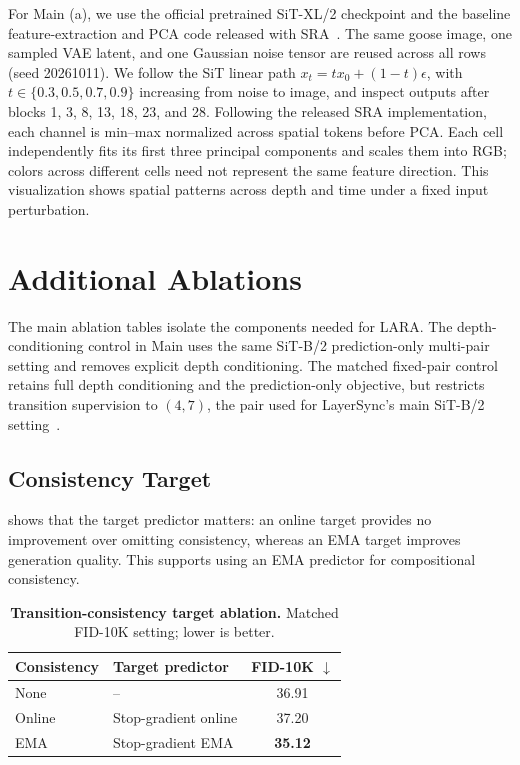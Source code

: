 For Main (a), we use the official pretrained SiT-XL/2 checkpoint and the baseline feature-extraction and PCA code released with SRA~\citep{ma2024sit,jiang2025sra}. The same goose image, one sampled VAE latent, and one Gaussian noise tensor are reused across all rows (seed 20261011). We follow the SiT linear path $x_t=t x_0+(1-t)\epsilon$, with $t\in\{0.3,0.5,0.7,0.9\}$ increasing from noise to image, and inspect outputs after blocks 1, 3, 8, 13, 18, 23, and 28. Following the released SRA implementation, each channel is min--max normalized across spatial tokens before PCA. Each cell independently fits its first three principal components and scales them into RGB; colors across different cells need not represent the same feature direction. This visualization shows spatial patterns across depth and time under a fixed input perturbation.

\section{Additional Ablations}
\label{app:realign_ablation_protocols}

The main ablation tables isolate the components needed for LARA. The depth-conditioning control in Main  uses the same SiT-B/2 prediction-only multi-pair setting and removes explicit depth conditioning. The matched fixed-pair control retains full depth conditioning and the prediction-only objective, but restricts transition supervision to $(4,7)$, the pair used for LayerSync's main SiT-B/2 setting~\citep{haghighi2026layersync}.

\subsection{Consistency Target}
\label{app:consistency_target}

 shows that the target predictor matters: an online target provides no improvement over omitting consistency, whereas an EMA target improves generation quality. This supports using an EMA predictor for compositional consistency.

\begin{table}[!htbp]
    \centering
    \caption{\textbf{Transition-consistency target ablation.} Matched FID-10K setting; lower is better.}
    \label{tab:appendix_consistency_target}
    \footnotesize
    \setlength{\tabcolsep}{4pt}
    \begin{tabular}{@{}llc@{}}
        \toprule
        Consistency & Target predictor & FID-10K $\downarrow$ \\
        \midrule
        None & -- & 36.91 \\
        Online & Stop-gradient online & 37.20 \\
        EMA & Stop-gradient EMA & \textbf{35.12} \\
        \bottomrule
    \end{tabular}
\end{table}

